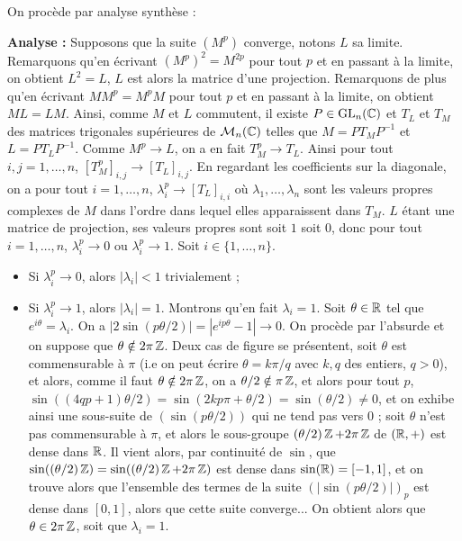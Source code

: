 \begin{solution}
    On procède par analyse synthèse :
    
    \textbf{Analyse :} Supposons que la suite $(M^p)$ converge, notons $L$ sa limite.
    Remarquons qu'en écrivant $(M^p)^2=M^{2p}$ pour tout $p$ et en passant à la limite, on obtient $L^2=L$,
    $L$ est alors la matrice d'une projection. Remarquons de plus qu'en écrivant $MM^p=M^pM$ pour tout $p$ et en passant à la limite, on obtient $ML=LM$.
    Ainsi, comme $M$ et $L$ commutent, il existe $P\in\operatorname{GL}_n(\operatorname{\mathbb C})$ et $T_L$ et $T_M$ des matrices trigonales supérieures de $\mathcal M_n(\operatorname{\mathbb C})$ telles que 
    $M=PT_MP^{-1}$ et $L=PT_LP^{-1}$. 
    Comme $M^p\to L$, on a en fait $T_M^p\to T_L$. 
    Ainsi pour tout $i,j=1,\dots,n$, $[T_M^p]_{i,j}\to [T_L]_{i,j}$.
    En regardant les coefficients sur la diagonale, on a pour tout $i=1,\dots,n$, $\lambda_i^p\to [T_L]_{i,i}$
    où $\lambda_1,\dots,\lambda_n$ sont les valeurs propres complexes de $M$ dans l'ordre dans lequel elles apparaissent dans $T_M$.
    $L$ étant une matrice de projection, ses valeurs propres sont soit $1$ soit $0$, donc pour tout $i=1,\dots,n$,
    $\lambda_i^p\to 0$ ou $\lambda_i^p\to 1$.
    Soit $i\in\lbrace1,\dots,n\rbrace$.
    \begin{itemize}
        \item Si $\lambda_i^p\to 0$, alors $|\lambda_i|<1$ trivialement ;
        \item Si $\lambda_i^p\to 1$, alors $|\lambda_i|=1$. 
        Montrons qu'en fait $\lambda_i=1$. 
        Soit $\theta\in\operatorname{\mathbb R}$ tel que $e^{i\theta}=\lambda_i$.
        On a $|2\sin(p\theta/2)|=|e^{ip\theta}-1|\to 0$. 
        On procède par l'absurde et on suppose que $\theta \notin 2\pi\operatorname{\mathbb Z}$.
        Deux cas de figure se présentent, soit $\theta$ est commensurable à $\pi$ 
        (i.e on peut écrire $\theta=k\pi/q$ avec $k,q$ des entiers, $q>0$),
        et alors, comme il faut $\theta\notin2\pi\operatorname{\mathbb Z}$, on a $\theta/2\notin\pi\operatorname{\mathbb Z}$, 
        et alors pour tout $p$, 
        $\sin((4qp+1)\theta/2)=\sin(2kp\pi+\theta/2)=\sin(\theta/2)\neq 0$,
        et on exhibe ainsi une sous-suite de $(\sin(p\theta/2))$ qui ne tend pas vers $0$ ;
        soit $\theta$ n'est pas commensurable à $\pi$, et alors le sous-groupe $(\theta/2)\operatorname{\mathbb Z}+2\pi\operatorname{\mathbb Z}$ de $(\operatorname{\mathbb R},+)$ est dense dans $\operatorname{\mathbb R}$.
        Il vient alors, par continuité de $\sin$, que $\sin((\theta/2)\operatorname{\mathbb Z})=\sin((\theta/2)\operatorname{\mathbb Z}+2\pi\operatorname{\mathbb Z})$ est dense dans $\sin(\operatorname{\mathbb R})=[-1,1]$, et on trouve alors 
        que l'ensemble des termes de la suite $(|\sin(p\theta/2)|)_p$ est dense dans $[0,1]$, alors que cette suite converge... 
        On obtient alors que $\theta\in 2\pi\operatorname{\mathbb Z}$, soit que $\lambda_i=1$.
    \end{itemize}
    

\end{solution}
